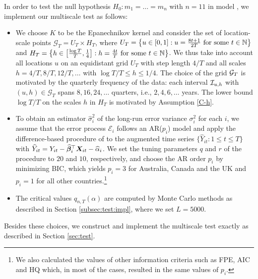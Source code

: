 \documentclass[12pt]{article}
\makeatletter
\renewcommand{\eqref}[1]{\tagform@{\ref{#1}}}
\makeatother
\begin{document}
In order to test the null hypothesis $H_0: m_1 = \ldots = m_n$ with $n = 11$ in model \eqref{eq:model:app}, we implement our multiscale test as follows: 
\begin{itemize}[leftmargin=0.5cm, itemsep=0pt, parsep=0pt, topsep=3pt]

\item We choose $K$ to be the Epanechnikov kernel and consider the set of location-scale points $\mathcal{G}_T = U_T \times H_T$, where 
$U_T = \big\{ u \in [0,1]: u = \textstyle{\frac{8t + 1}{2T}} \text{ for some } t \in \mathbb{N} \big\}$ and
$H_T = \big\{ h \in \big[ \textstyle{\frac{\log T}{T}}, \textstyle{\frac{1}{4}} \big]:  h = \textstyle{\frac{4t}{T}} \text{ for some } t \in \mathbb{N} \big\}$. 
We thus take into account all locations $u$ on an equidistant grid $U_T$ with step length $4/T$ and all scales $h=4/T, 8/T, 12/T,\ldots$ with $\log T /T \le h \le 1/4$. 
The choice of the grid $\mathcal{G}_T$ is motivated by the quarterly frequency of the data: each interval $\mathcal{I}_{u, h}$ with $(u,h) \in \mathcal{G}_T$ spans $8, 16, 24, \ldots$ quarters, i.e., $2, 4, 6, \ldots$ years. The lower bound $\log T / T$ on the scales $h$ in $H_T$ is motivated by Assumption \ref{C-h}. %

 
\item To obtain an estimator $\widehat{\sigma}_i^2$ of the long-run error variance $\sigma^2_i$ for each $i$, we assume that the error process $\mathcal{E}_i$ follows an AR($p_i$) model and apply the difference-based procedure of \cite{KhismatullinaVogt2020} to the augmented time series $\{\widehat{Y}_{it}: 1\leq t \leq T\}$ with $\widehat{Y}_{it} = Y_{it} - \widehat{\bm{\beta}}_i^\top \boldsymbol{X}_{it} - \widehat{\alpha}_{i}$. We set the tuning parameters $q$ and $r$ of the procedure to $20$ and $10$, respectively, and choose the AR order $p_i$ by minimizing BIC, which yields $p_i = 3$ for Australia, Canada and the UK and $p_i = 1$ for all other countries.\footnote{We also calculated the values of other information criteria such as FPE, AIC and HQ which, in most of the cases, resulted in the same values of $p_i$.} 

\item The critical values $q_{n, T}(\alpha)$ are computed by Monte Carlo methods as described in Section \ref{subsec:test:impl}, where we set $L=5000$.
\end{itemize}
Besides these choices, we construct and implement the multiscale test exactly as described in Section \ref{sec:test}.  
\end{document}
